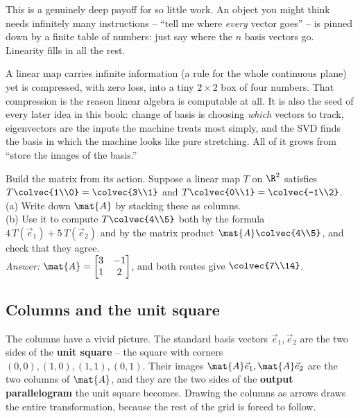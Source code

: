 This is a genuinely deep payoff for so little work. An object you might think
needs infinitely many instructions -- ``tell me where \emph{every} vector goes''
-- is pinned down by a finite table of numbers: just say where the $n$ basis
vectors go. Linearity fills in all the rest.

\begin{aestheticbox}
A linear map carries infinite information (a rule for the whole continuous plane)
yet is compressed, with zero loss, into a tiny $2\times 2$ box of four numbers.
That compression is the reason linear algebra is computable at all. It is also
the seed of every later idea in this book: change of basis is choosing
\emph{which} vectors to track, eigenvectors are the inputs the machine treats
most simply, and the SVD finds the basis in which the machine looks like pure
stretching. All of it grows from ``store the images of the basis.''
\end{aestheticbox}

\begin{labbox}
Build the matrix from its action. Suppose a linear map $T$ on $\R^2$ satisfies
$T\colvec{1\\0} = \colvec{3\\1}$ and $T\colvec{0\\1} = \colvec{-1\\2}$. \\[0.3em]
(a) Write down $\mat{A}$ by stacking these as columns. \\
(b) Use it to compute $T\colvec{4\\5}$ both by the formula
$4\,T(\vec{e}_1) + 5\,T(\vec{e}_2)$ and by the matrix product $\mat{A}\colvec{4\\5}$,
and check that they agree. \\[0.3em]
\emph{Answer:} $\mat{A} = \begin{bmatrix} 3 & -1 \\ 1 & 2\end{bmatrix}$, and both
routes give $\colvec{7\\14}$.
\end{labbox}

\subsection{Columns and the unit square}

The columns have a vivid picture. The standard basis vectors $\vec{e}_1,
\vec{e}_2$ are the two sides of the \textbf{unit square} -- the square with
corners $(0,0), (1,0), (1,1), (0,1)$. Their images $\mat{A}\vec{e}_1,
\mat{A}\vec{e}_2$ are the two columns of $\mat{A}$, and they are the two sides of
the \textbf{output parallelogram} the unit square becomes. Drawing the columns as
arrows draws the entire transformation, because the rest of the grid is forced to
follow.

